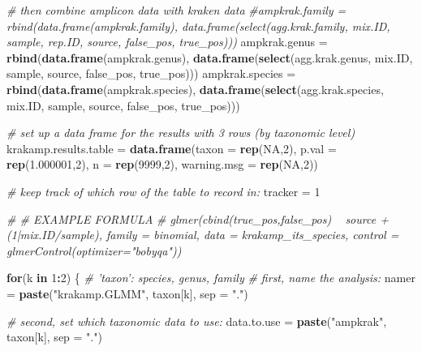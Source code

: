 \documentclass[
]{article}
\newenvironment{Shaded}{\begin{snugshade}}{\end{snugshade}}
\newcommand{\CommentTok}[1]{\textcolor[rgb]{0.56,0.35,0.01}{\textit{#1}}}
\newcommand{\ControlFlowTok}[1]{\textcolor[rgb]{0.13,0.29,0.53}{\textbf{#1}}}
\newcommand{\DataTypeTok}[1]{\textcolor[rgb]{0.13,0.29,0.53}{#1}}
\newcommand{\DecValTok}[1]{\textcolor[rgb]{0.00,0.00,0.81}{#1}}
\newcommand{\FloatTok}[1]{\textcolor[rgb]{0.00,0.00,0.81}{#1}}
\newcommand{\KeywordTok}[1]{\textcolor[rgb]{0.13,0.29,0.53}{\textbf{#1}}}
\newcommand{\NormalTok}[1]{#1}
\newcommand{\OperatorTok}[1]{\textcolor[rgb]{0.81,0.36,0.00}{\textbf{#1}}}
\newcommand{\OtherTok}[1]{\textcolor[rgb]{0.56,0.35,0.01}{#1}}
\newcommand{\StringTok}[1]{\textcolor[rgb]{0.31,0.60,0.02}{#1}}
\begin{document}
\begin{Shaded}
\begin{Highlighting}[]
\CommentTok{# then combine amplicon data with kraken data}
\CommentTok{#ampkrak.family = rbind(data.frame(ampkrak.family), data.frame(select(agg.krak.family, mix.ID, sample, rep.ID, source, false_pos, true_pos)))}
\NormalTok{ampkrak.genus =}\StringTok{ }\KeywordTok{rbind}\NormalTok{(}\KeywordTok{data.frame}\NormalTok{(ampkrak.genus), }\KeywordTok{data.frame}\NormalTok{(}\KeywordTok{select}\NormalTok{(agg.krak.genus, mix.ID, sample, source, false_pos, true_pos)))}
\NormalTok{ampkrak.species =}\StringTok{ }\KeywordTok{rbind}\NormalTok{(}\KeywordTok{data.frame}\NormalTok{(ampkrak.species), }\KeywordTok{data.frame}\NormalTok{(}\KeywordTok{select}\NormalTok{(agg.krak.species, mix.ID, sample, source, false_pos, true_pos)))}

\CommentTok{# set up a data frame for the results with 3 rows (by taxonomic level)}
\NormalTok{krakamp.results.table =}\StringTok{ }\KeywordTok{data.frame}\NormalTok{(}\DataTypeTok{taxon  =} \KeywordTok{rep}\NormalTok{(}\OtherTok{NA}\NormalTok{,}\DecValTok{2}\NormalTok{), }\DataTypeTok{p.val  =} \KeywordTok{rep}\NormalTok{(}\FloatTok{1.000001}\NormalTok{,}\DecValTok{2}\NormalTok{), }\DataTypeTok{n  =} \KeywordTok{rep}\NormalTok{(}\DecValTok{9999}\NormalTok{,}\DecValTok{2}\NormalTok{), }\DataTypeTok{warning.msg =} \KeywordTok{rep}\NormalTok{(}\OtherTok{NA}\NormalTok{,}\DecValTok{2}\NormalTok{))}

\CommentTok{# keep track of which row of the table to record in:}
\NormalTok{tracker =}\StringTok{ }\DecValTok{1}

\CommentTok{# # EXAMPLE FORMULA}
\CommentTok{# glmer(cbind(true_pos,false_pos) ~ source + (1|mix.ID/sample), family = binomial, data = krakamp_its_species, control = glmerControl(optimizer="bobyqa"))}


\ControlFlowTok{for}\NormalTok{(k }\ControlFlowTok{in} \DecValTok{1}\OperatorTok{:}\DecValTok{2}\NormalTok{) \{ }\CommentTok{# 'taxon': species, genus, family}
        \CommentTok{# first, name the analysis:}
\NormalTok{        namer =}\StringTok{ }\KeywordTok{paste}\NormalTok{(}\StringTok{"krakamp.GLMM"}\NormalTok{, taxon[k], }\DataTypeTok{sep =} \StringTok{"."}\NormalTok{)}
        
        \CommentTok{# second, set which taxonomic data to use:}
\NormalTok{        data.to.use =}\StringTok{ }\KeywordTok{paste}\NormalTok{(}\StringTok{"ampkrak"}\NormalTok{, taxon[k], }\DataTypeTok{sep =} \StringTok{"."}\NormalTok{)}
        

\end{Highlighting}
\end{Shaded}
\end{document}
